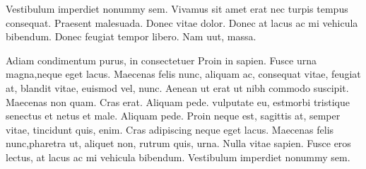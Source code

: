 \documentclass[a4paper,10pt,twocolumn]{scrartcl} %
\begin{document}
Vestibulum imperdiet nonummy sem. Vivamus sit amet erat nec turpis tempus consequat. Praesent malesuada. Donec vitae dolor. Donec at lacus ac mi vehicula bibendum. Donec feugiat tempor libero. Nam uut, massa.

\begin{thebibliography}{}    %
 Adiam condimentum purus, in consectetuer Proin in sapien. 
 Fusce urna magna,neque eget lacus. 
 Maecenas felis nunc, aliquam ac, consequat vitae, feugiat at, blandit vitae, euismod vel, nunc. 
 Aenean ut erat ut nibh commodo suscipit. Maecenas non quam. 
 Cras erat. Aliquam pede. vulputate eu, estmorbi tristique senectus et netus et male. 
 Aliquam pede. Proin neque est, sagittis at, semper vitae, tincidunt quis, enim. 
 Cras adipiscing neque eget lacus. 
 Maecenas felis nunc,pharetra ut, aliquet non, rutrum quis, urna. Nulla vitae sapien. 
 Fusce eros lectus, at lacus ac mi vehicula bibendum.
 Vestibulum imperdiet nonummy sem. 
\end{thebibliography}
\end{document}

